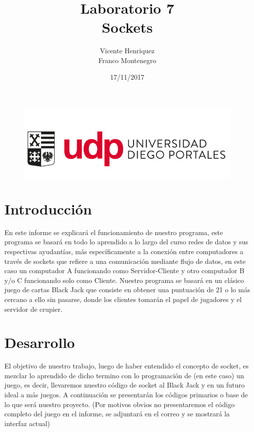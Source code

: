 \documentclass{article}
\begin{document}
\begin{figure}[t!]
\includegraphics[scale=0.3]{logo_udp.PNG}
\label{fig:udplogo}
\end{figure}

\title{\textbf{{Laboratorio 7 \\ Sockets \vspace{10cm}}}}
\author{\hspace{8cm} Vicente Henriquez \\ \hspace{8cm} Franco Montenegro}
\date{\hspace{8cm} 17/11/2017}
\maketitle

\newpage
\tableofcontents

\newpage
\section{Introducción\vspace{0.5cm}}
En este informe se explicará el funcionamiento de nuestro programa, este programa se basará en todo lo aprendido a lo largo del curso redes de datos y sus respectivas ayudantías, más específicamente a la conexión entre computadores a través de sockets que refiere a una comunicación mediante flujo de datos, en este caso un computador A funcionando como Servidor-Cliente y otro computador B y/o C funcionando solo como Cliente.
Nuestro programa se basará en un clásico juego de cartas Black Jack que consiste en obtener una puntuación de 21 o lo más cercano a ello sin pasarse, donde los clientes tomarán el papel de jugadores y el servidor de crupier. 

\newpage
\section{Desarrollo\vspace{0.5cm}}
El objetivo de nuestro trabajo, luego de haber entendido el concepto de socket, es mezclar lo aprendido de dicho termino con lo programación de (en este caso) un juego, es decir, llevaremos nuestro código de socket al Black Jack y en un futuro ideal a más juegos.\newline
A continuación se presentarán los códigos primarios o base de lo que será nuestro proyecto. (Por motivos obvios no presentaremos el código completo del juego en el informe, se adjuntará en el correo y se mostrará la interfaz actual)
\end{document}
